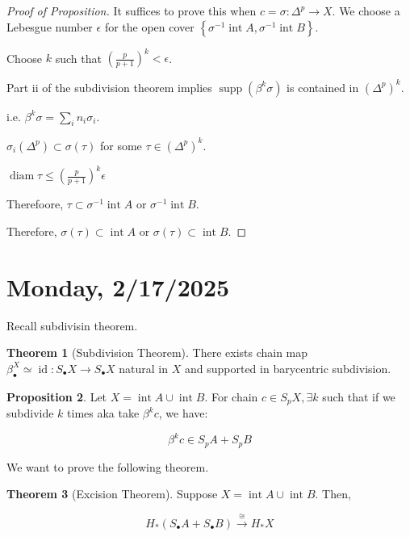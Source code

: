 \documentclass{article}
\theoremstyle{definition}
\newtheorem{theorem}{Theorem}
\newtheorem{proposition}[theorem]{Proposition}
\begin{document}
    \begin{proof}
        [Proof of Proposition] It suffices to prove this when \(c = \sigma : \Delta^p \to X\). We choose a Lebesgue number \(\epsilon\) for the open cover \(\left\{ \sigma ^{-1} \operatorname{int} A, \sigma ^{-1} \operatorname{int} B \right\}\).

        Choose \(k\) such that \(\left( \frac{p}{p+1} \right)^k < \epsilon\).

        Part ii of the subdivision theorem implies \(\mathop{\mathrm{supp}}(\beta^k \sigma) \) is contained in \((\Delta^p)^k\).
        
        i.e. \(\beta^k \sigma = \sum_{i} n_i \sigma_i\).

        \(\sigma_i(\Delta^p) \subset \sigma(\tau)\) for some \(\tau \in(\Delta^p)^k\).

        \(\operatorname{diam} \tau \leq \left( \frac{p}{p+1} \right)^k \epsilon\)

        Therefoore, \(\tau \subset \sigma ^{-1} \operatorname{int} A\) or \(\sigma ^{-1} \operatorname{int} B\).

        Therefore, \(\sigma(\tau) \subset \operatorname{int} A\) or \(\sigma(\tau) \subset \operatorname{int} B\).

    \end{proof}

    \section*{Monday, 2/17/2025}
    
    Recall subdivisin theorem.

    \begin{theorem}
        [Subdivision Theorem] There exists chain map \(\beta^X_\bullet \simeq \operatorname{id}: S_\bullet X \to S_\bullet X\) natural in \(X\) and supported in barycentric subdivision.
    \end{theorem}

    \begin{proposition}
        Let \(X = \operatorname{int} A \cup \operatorname{int} B\). For chain \(c\in S_p X, \exists k\) such that if we subdivide \(k\) times aka take \(\beta^k c\), we have:

        \[
            \beta^k c \in S_p A + S_p B
        \]
    \end{proposition}

    We want to prove the following theorem.

    \begin{theorem}
        [Excision Theorem] Suppose \(X = \operatorname{int} A \cup \operatorname{int} B\). Then,

        \[
            H_{\ast} (S_\bullet A + S_\bullet B) \xrightarrow{\cong} H_{\ast} X
        \]
    \end{theorem}
\end{document}

